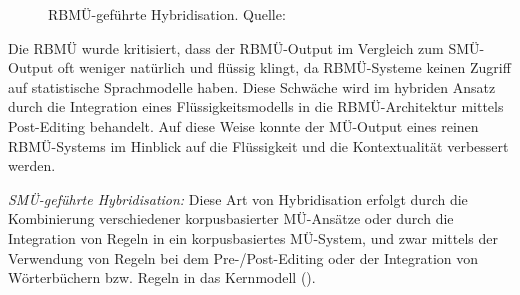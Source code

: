 \begin{figure}
\caption{RBMÜ-geführte Hybridisation. Quelle: \citealt{Costa-JussàFonollosa2015}}
\label{fig:3:3}
\end{figure}


Die RBMÜ wurde kritisiert, dass der RBMÜ-Output im Vergleich zum SMÜ-Output oft weniger natürlich und flüssig klingt, da RBMÜ-Systeme keinen Zugriff auf statistische Sprachmodelle haben. Diese Schwäche wird im hybriden Ansatz durch die Integration eines Flüssigkeitsmodells in die RBMÜ-Architektur mittels Post-Editing behandelt. Auf diese Weise konnte der MÜ-Output eines reinen RBMÜ-Systems im Hinblick auf die Flüssigkeit und die Kontextualität verbessert werden. \citep{EiseleEtAl2008}

\textit{SMÜ-geführte Hybridisation:} Diese Art von Hybridisation erfolgt durch die Kombinierung verschiedener korpusbasierter MÜ-Ansätze oder durch die Integration von Regeln in ein korpusbasiertes MÜ-System, und zwar mittels der Verwendung von Regeln bei dem Pre-/Post-Editing oder der Integration von Wörterbüchern bzw. Regeln in das Kernmodell (\citealt{Costa-JussàFonollosa2015}).


